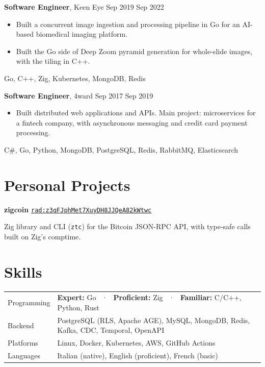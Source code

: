 \documentclass[a4paper,10pt]{article}
\newcommand{\dates}[1]{{\small\ttfamily #1}}
\newcommand{\job}[3]{\textbf{#1}, #2 \hfill \dates{#3}\par\nopagebreak}
\newcommand{\stack}[1]{{\small\ttfamily\color{darkgray}#1}\par\vspace{3pt}}
\newcommand{\project}[4]{\textbf{#1} \hfill \href{#3}{#2}\par\nopagebreak #4\par}
\begin{document}
\job{Software Engineer}{Keen Eye}{Sep 2019 \textendash{} Sep 2022}
\begin{itemize}
  \item Built a concurrent image ingestion and processing pipeline in Go for an AI-based biomedical imaging platform.
  \item Built the Go side of Deep Zoom pyramid generation for whole-slide images, with the tiling in C++.
\end{itemize}
\stack{Go, C++, Zig, Kubernetes, MongoDB, Redis}

\job{Software Engineer}{4ward}{Sep 2017 \textendash{} Sep 2019}
\begin{itemize}
  \item Built distributed web applications and APIs. Main project: microservices for a fintech company,
        with asynchronous messaging and credit card payment processing.
\end{itemize}
\stack{C\#, Go, Python, MongoDB, PostgreSQL, Redis, RabbitMQ, Elasticsearch}

\section{Personal Projects}
\project{zigcoin}{\texttt{rad:z3qFJphMet7XuyDH8JJQeA82kWtwc}}{https://app.radicle.xyz/nodes/iris.radicle.network/rad:z3qFJphMet7XuyDH8JJQeA82kWtwc}{Zig library and CLI (\texttt{ztc}) for the Bitcoin JSON-RPC API, with type-safe calls built on Zig's comptime.}
\section{Skills}
\begin{tabularx}{\linewidth}{@{}l X@{}}
Programming   & \textbf{Expert:} Go \ · \ \textbf{Proficient:} Zig \ · \ \textbf{Familiar:} C/C++, Python, Rust \\
Backend       & PostgreSQL (RLS, Apache AGE), MySQL, MongoDB, Redis, Kafka, CDC, Temporal, OpenAPI \\
Platforms     & Linux, Docker, Kubernetes, AWS, GitHub Actions \\
Languages     & Italian (native), English (proficient), French (basic) \\
\end{tabularx}
\end{document}
